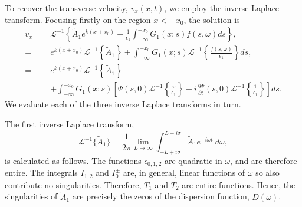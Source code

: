 To recover the transverse velocity, $v_x(x, t)$, we employ the inverse Laplace transform. Focusing firstly on the region $x < -x_0$, the solution is
\newcommand{\e}{\epsilon}
\begin{align}
v_x =& \mathcal{L}^{-1} \left\{ \tilde{A}_1 e^{k(x+x_0)} + \frac{1}{\e_1} \int_{-\infty}^{-x_0} G_1(x;s)f(s, \omega)ds \right\}, \\
=& e^{k(x+x_0)} \mathcal{L}^{-1}\left\{ \tilde{A}_1 \right\} + \int_{-\infty}^{-x_0} G_1(x;s) \mathcal{L}^{-1}\left\{ \frac{f(s, \omega)}{\e_1} \right\} ds, \\
=& e^{k(x+x_0)} \mathcal{L}^{-1}\left\{ \tilde{A}_1 \right\} \\
& + \int_{-\infty}^{-x_0} G_1(x;s) \left[ \Psi (s, 0) \mathcal{L}^{-1}\left\{ \frac{\omega}{\e_1} \right\} + i \frac{\partial \Psi}{\partial t}(s, 0) \mathcal{L}^{-1}\left\{ \frac{1}{\e_1} \right\}\right] ds.
\label{sol incomp}
\end{align}
We evaluate each of the three inverse Laplace transforms in turn.

The first inverse Laplace transform,
\begin{equation}
\mathcal{L}^{-1} \{\tilde{A}_1\} = \frac{1}{2\pi} \lim_{L \to \infty} \int_{-L + i\sigma}^{L + i\sigma} \tilde{A}_1 e^{-i\omega t} ~d\omega,
\end{equation}
is calculated as follows. The functions $\epsilon_{0,1,2}$ are quadratic in $\omega$, and are therefore entire. The integrals $I_{1,2}$ and $I_0^\pm$ are, in general, linear functions of $\omega$ so also contribute no singularities. Therefore, $T_1$ and $T_2$ are entire functions. Hence, the singularities of $\tilde{A}_1$ are precisely the zeros of the dispersion function, $D(\omega)$.

